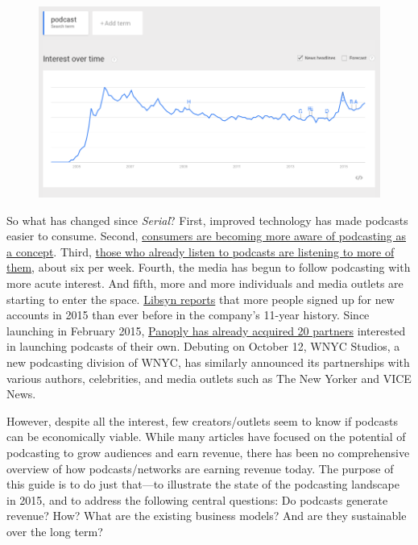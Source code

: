 \documentclass[notoc, symmetric, nobib, nols]{towcenter-guideto-book}
\begin{document}
\begin{figure}
\begin{centering}
\includegraphics[width=.9\textwidth]{graphics/PODCAST15_Trends_podcast.png}
\caption{} 
\end{centering}
\end{figure}

So what has changed since \textit{Serial}? First, improved technology has made podcasts easier to consume. Second, \href{http://www.edisonresearch.com/the-podcast-consumer-2015/}{consumers are becoming more aware of podcasting as a concept}. Third, \href{http://www.edisonresearch.com/the-podcast-consumer-2015/}{those who already listen to podcasts are listening to more of them}, about six per week.\autocite{EdPCconsumer} Fourth, the media has begun to follow podcasting with more acute interest. And fifth, more and more individuals and media outlets are starting to enter the space. \href{http://www.libsyn.com/wp-content/uploads/2015/06/PRLibsynNetGrowth021915Final.pdf}{Libsyn reports} that more people signed up for new accounts in 2015 than ever before in the company's 11-year history.\autocite{libsyndata} Since launching in February 2015, \href{http://panoplymedia.tumblr.com/post/126958922613/eleven-shows-from-sports-illustrated-join-panoply}{Panoply has already acquired 20 partners} interested in launching podcasts of their own.\autocite{panoplyaudiometric} Debuting on October 12, WNYC Studios, a new podcasting division of WNYC, has similarly announced its partnerships with various authors, celebrities, and media outlets such as The New Yorker and VICE News.\autocite{wnycstudios} 

However, despite all the interest, few creators/outlets seem to know if podcasts can be economically viable. While many articles have focused on the potential of podcasting to grow audiences and earn revenue, there has been no comprehensive overview of how podcasts/networks are earning revenue today. The purpose of this guide is to do just that---to illustrate the state of the podcasting landscape in 2015, and to address the following central questions: Do podcasts generate revenue? How? What are the existing business models? And are they sustainable over the long term?
\end{document}
